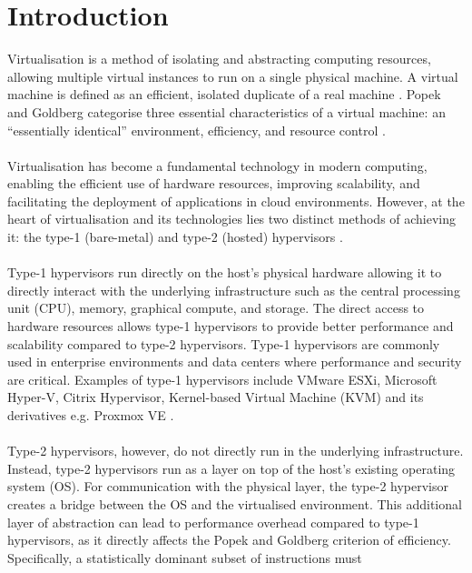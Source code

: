 \documentclass[a4paper, 12pt]{article}
\theoremstyle{plain}
\theoremstyle{definition}
\theoremstyle{remark}
\begin{document}
	\section{Introduction}
    Virtualisation is a method of isolating and abstracting computing resources, allowing
    multiple virtual instances to run on a single physical machine. A virtual machine
    is defined as an efficient, isolated duplicate of a real machine
    \parencite{popekFormalRequirementsVirtualizable1974}. Popek and Goldberg categorise
    three essential characteristics of a virtual machine: an ``essentially identical''
    environment, efficiency, and resource control \parencite{popekFormalRequirementsVirtualizable1974}. \\
    \\
    \noindent Virtualisation has become a fundamental technology in modern computing,
    enabling the efficient use of hardware resources, improving scalability, and
    facilitating the deployment of applications in cloud environments. However, at the
    heart of virtualisation and its technologies lies two distinct methods of achieving it:
     the type-1 (bare-metal) and type-2 (hosted) hypervisors \parencite{smalleyWhatAreHypervisors2024}.\\
    \\
    \noindent Type-1 hypervisors run directly on the host's physical hardware allowing it to
    directly interact with the underlying infrastructure such as the central processing
    unit (CPU), memory, graphical compute, and storage. The direct access to hardware
    resources allows type-1 hypervisors to provide better performance and scalability
    compared to type-2 hypervisors. Type-1 hypervisors are commonly used in enterprise
    environments and data centers where performance and security are critical. Examples
    of type-1 hypervisors include VMware ESXi, Microsoft Hyper-V, Citrix Hypervisor,
    Kernel-based Virtual Machine (KVM) and its derivatives e.g. Proxmox VE \parencite{smalleyWhatAreHypervisors2024}.\\
    \\
    \noindent Type-2 hypervisors, however, do not directly run in the underlying
    infrastructure. Instead, type-2 hypervisors run as a layer on top of the host's
    existing operating system (OS). For communication with the physical layer, the type-2
    hypervisor creates a bridge between the OS and the virtualised environment. This
    additional layer of abstraction can lead to performance overhead compared to type-1
    hypervisors, as it directly affects the Popek and Goldberg criterion of efficiency. Specifically, a statistically dominant subset of instructions must
\end{document}

